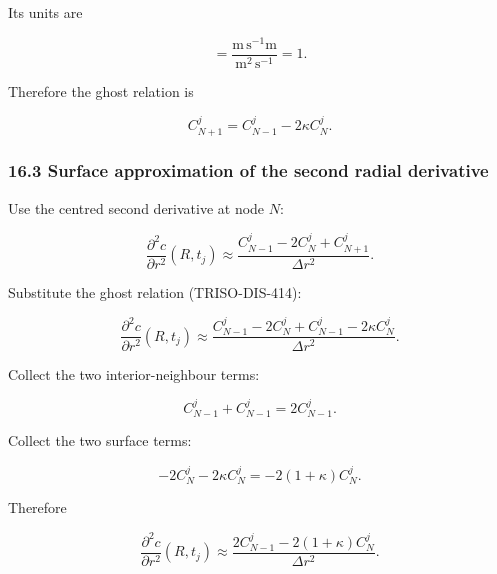 \documentclass[11pt,a4paper]{article}
\begin{document}
Its units are

\begin{equation}
[\kappa]
=
\frac{
\mathrm{m\,s^{-1}}\mathrm m
}{
\mathrm{m^2\,s^{-1}}
}
=
1.
\tag{TRISO-DIS-413}
\label{eq:triso-dis-413}
\end{equation}

Therefore the ghost relation is

\begin{equation}
\boxed{
C_{N+1}^j
=
C_{N-1}^j
-
2\kappa C_N^j.
}
\tag{TRISO-DIS-414}
\label{eq:triso-dis-414}
\end{equation}

\subsubsection*{16.3 Surface approximation of the second radial derivative}

Use the centred second derivative at node $N$:

\begin{equation}
\frac{\partial^2c}{\partial r^2}(R,t_j)
\approx
\frac{
C_{N-1}^j
-
2C_N^j
+
C_{N+1}^j
}{
\Delta r^2
}.
\tag{TRISO-DIS-415}
\label{eq:triso-dis-415}
\end{equation}

Substitute the ghost relation (TRISO-DIS-414):

\begin{equation}
\frac{\partial^2c}{\partial r^2}(R,t_j)
\approx
\frac{
C_{N-1}^j
-
2C_N^j
+
C_{N-1}^j
-
2\kappa C_N^j
}{
\Delta r^2
}.
\tag{TRISO-DIS-416}
\label{eq:triso-dis-416}
\end{equation}

Collect the two interior-neighbour terms:

\begin{equation}
C_{N-1}^j+C_{N-1}^j
=
2C_{N-1}^j.
\tag{TRISO-DIS-417}
\label{eq:triso-dis-417}
\end{equation}

Collect the two surface terms:

\begin{equation}
-2C_N^j-2\kappa C_N^j
=
-2(1+\kappa)C_N^j.
\tag{TRISO-DIS-418}
\label{eq:triso-dis-418}
\end{equation}

Therefore

\begin{equation}
\boxed{
\frac{\partial^2c}{\partial r^2}(R,t_j)
\approx
\frac{
2C_{N-1}^j
-
2(1+\kappa)C_N^j
}{
\Delta r^2
}.
}
\tag{TRISO-DIS-419}
\label{eq:triso-dis-419}
\end{equation}
\end{document}
